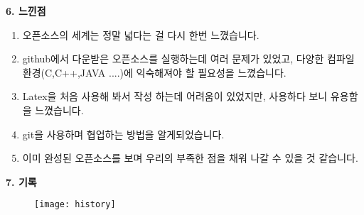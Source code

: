 \documentclass{article}
\begin{document}
\begin{large}\textbf{6. 느낀점}\end{large}
\begin{enumerate}
\item 오픈소스의 세계는 정말 넓다는 걸 다시 한번 느꼈습니다.
\item github에서 다운받은 오픈소스를 실행하는데 여러 문제가 있었고, 다양한 컴파일 환경(C,C++,JAVA ....)에 익숙해져야 할 필요성을 느꼈습니다. 
\item Latex을 처음 사용해 봐서 작성 하는데 어려움이 있었지만, 사용하다 보니 유용함을 느꼈습니다. 
\item git을 사용하며 협업하는 방법을 알게되었습니다.
\item 이미 완성된 오픈소스를 보며 우리의 부족한 점을 채워 나갈 수 있을 것 같습니다.

\end{enumerate}

\newpage
\begin{large}\textbf{7. 기록}\end{large}
 \begin{figure}[!h]
\centering
\texttt{[image: history]}
\end{figure}
\end{document}
